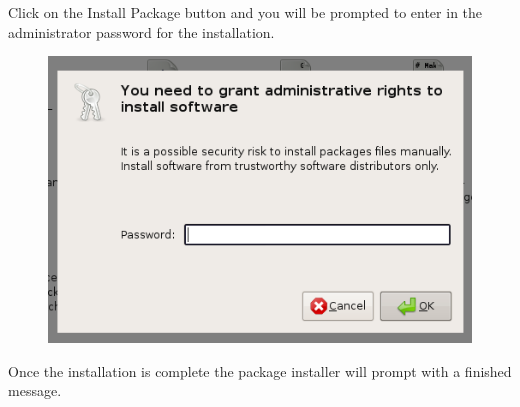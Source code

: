 \documentclass[12pt]{article}
\begin{document}
Click on the Install Package button and you will be prompted to enter in the administrator password for the installation.

\begin{figure}[h]
   \centering
   \includegraphics[scale=0.6]{figures/install-user-deb-admin.png}
\end{figure}

Once the installation is complete the package installer will prompt with a finished message.
\end{document}
